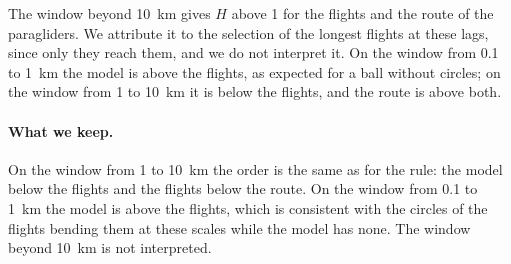 \documentclass[11pt,a4paper]{article}
\begin{document}
\begin{table}[t]
\centering
\caption{$H$ on fixed windows of arc length $s = v\tau$, with 95\% intervals.}
\label{tab:flwindows}
\scriptsize
\setlength{\tabcolsep}{2pt}

\end{table}

The window beyond 10~km gives $H$ above 1 for the flights and the route of the paragliders. We attribute it to
the selection of the longest flights at these lags, since only they reach them, and we do not interpret it. On the window from 0.1 to 1~km the model is above the flights, as expected for a ball without
circles; on the window from 1 to 10~km it is below the flights, and the route is above both.

\paragraph{What we keep.} On the window from 1 to 10~km the order is the same as for the rule: the model below
the flights and the flights below the route. On the window from 0.1 to 1~km the model is above the flights, which
is consistent with the circles of the flights bending them at these scales while the model has none. The window
beyond 10~km is not interpreted.
\end{document}
